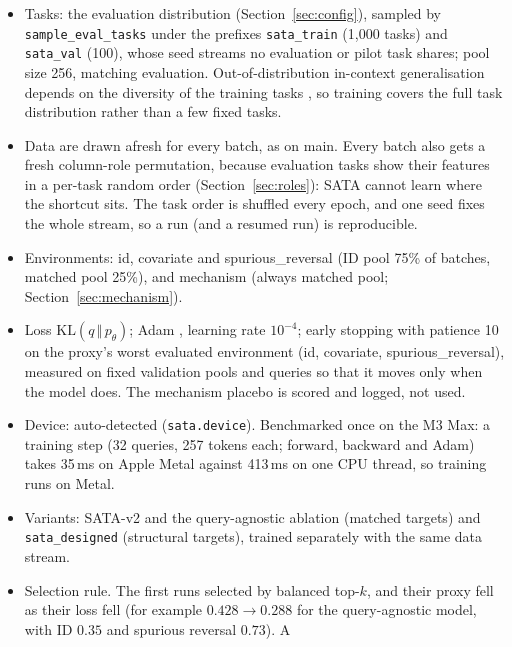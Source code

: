 \documentclass[11pt,a4paper]{article}
\newcommand{\1}{\mathbf{1}}
\theoremstyle{plain}
\theoremstyle{definition}
\theoremstyle{remark}
\begin{document}
\begin{itemize}[nosep]
  \item Tasks: the evaluation distribution (Section~\ref{sec:config}),
        sampled by \texttt{sample\_eval\_tasks} under the prefixes
        \texttt{sata\_train} (1{,}000 tasks) and \texttt{sata\_val} (100), whose
        seed streams no evaluation or pilot task shares; pool size 256,
        matching evaluation. Out-of-distribution in-context generalisation
        depends on the diversity of the training tasks
        \citep{goddard2025when}, so training covers the full task
        distribution rather than a few fixed tasks.
  \item Data are drawn afresh for every batch, as on main. Every batch also
        gets a fresh column-role permutation, because evaluation tasks show
        their features in a per-task random order
        (Section~\ref{sec:roles}): SATA cannot learn where the shortcut sits.
        The task order is shuffled every epoch, and one seed fixes the whole
        stream, so a run (and a resumed run) is reproducible.
  \item Environments: id, covariate and spurious\_reversal (ID pool 75\% of
        batches, matched pool 25\%), and mechanism (always matched pool;
        Section~\ref{sec:mechanism}).
  \item Loss $\mathrm{KL}(q \,\Vert\, p_\theta)$; Adam
        \citep{kingma2015adam}, learning rate $10^{-4}$; early stopping
        \citep{prechelt1998early} with patience 10 on the proxy's worst
        evaluated environment (id, covariate, spurious\_reversal), measured on
        fixed validation pools and queries so that it moves only when the
        model does. The mechanism placebo is scored and logged, not used.
  \item Device: auto-detected (\texttt{sata.device}). Benchmarked once on the
        M3 Max: a training step (32 queries, 257 tokens each; forward,
        backward and Adam) takes 35\,ms on Apple Metal against 413\,ms on one
        CPU thread, so training runs on Metal.
  \item Variants: SATA-v2 and the query-agnostic ablation (matched targets)
        and \texttt{sata\_designed} (structural targets), trained separately
        with the same data stream.
  \item Selection rule. The first runs selected by balanced top-$k$, and their
        proxy fell as their loss fell (for example $0.428 \to 0.288$ for the
        query-agnostic model, with ID $0.35$ and spurious reversal $0.73$). A

\end{itemize}
\end{document}
